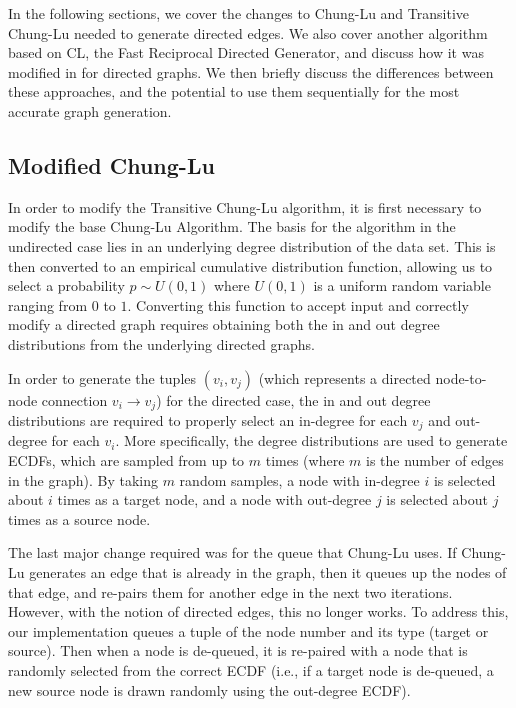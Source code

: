\documentclass[pdftex,11pt,a4paper,twocolumn]{scrartcl}
\begin{document}
In the following sections, we cover the changes to Chung-Lu and Transitive Chung-Lu needed to generate directed edges. We also cover another algorithm based on CL, the Fast Reciprocal Directed Generator, and discuss how it was modified in \cite{FRDG} for directed graphs. We then briefly discuss the differences between these approaches, and the potential to use them sequentially for the most accurate graph generation. 

\subsection{Modified Chung-Lu}

In order to modify the Transitive Chung-Lu algorithm, it is first necessary to modify the base Chung-Lu Algorithm. The basis for the algorithm in the undirected case lies in an underlying degree distribution of the data set. This is then converted to an empirical cumulative distribution function, allowing us to select a probability $p \sim U(0,1)$ where $U(0,1)$ is a uniform random variable ranging from $0$ to $1$. Converting this function to accept input and correctly modify a directed graph requires obtaining both the in and out degree distributions from the underlying directed graphs. 

In order to generate the tuples $(v_i,v_j)$ (which represents a directed node-to-node connection $v_i \rightarrow v_j$) for the directed case, the in and out degree distributions are required to properly select an in-degree for each $v_j$ and out-degree for each $v_i$. More specifically, the degree distributions are used to generate ECDFs, which are sampled from up to $m$ times (where $m$ is the number of edges in the graph). By taking $m$ random samples, a node with in-degree $i$ is selected about $i$ times as a target node, and a node with out-degree $j$ is selected about $j$ times as a source node. 

The last major change required was for the queue that Chung-Lu uses. If Chung-Lu generates an edge that is already in the graph, then it queues up the nodes of that edge, and re-pairs them for another edge in the next two iterations. However, with the notion of directed edges, this no longer works. To address this, our implementation queues a tuple of the node number and its type (target or source). Then when a node is de-queued, it is re-paired with a node that is randomly selected from the correct ECDF (i.e., if a target node is de-queued, a new source node is drawn randomly using the out-degree ECDF). 
\end{document}
